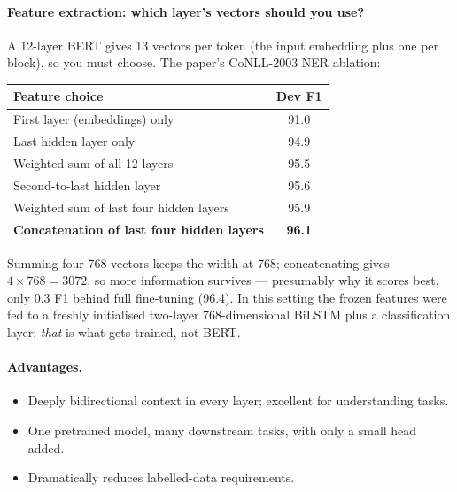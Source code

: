 \documentclass[11pt,a4paper]{article}
\begin{document}
\paragraph{Feature extraction: which layer's vectors should you use?} A 12-layer BERT gives 13
vectors per token (the input embedding plus one per block), so you must choose. The paper's
CoNLL-2003 NER ablation:
\begin{center}
\begin{tabular}{lc}
\textbf{Feature choice} & \textbf{Dev F1} \\
\hline
First layer (embeddings) only & 91.0 \\
Last hidden layer only & 94.9 \\
Weighted sum of all 12 layers & 95.5 \\
Second-to-last hidden layer & 95.6 \\
Weighted sum of last four hidden layers & 95.9 \\
\textbf{Concatenation of last four hidden layers} & \textbf{96.1} \\
\end{tabular}
\end{center}
Summing four 768-vectors keeps the width at 768; concatenating gives $4 \times 768 = 3072$, so
more information survives --- presumably why it scores best, only 0.3 F1 behind full
fine-tuning (96.4). In this setting the frozen features were fed to a freshly initialised
two-layer 768-dimensional BiLSTM plus a classification layer; \emph{that} is what gets trained,
not BERT.

\paragraph{Advantages.}
\begin{itemize}
\item Deeply bidirectional context in every layer; excellent for understanding tasks.
\item One pretrained model, many downstream tasks, with only a small head added.
\item Dramatically reduces labelled-data requirements.
\end{itemize}
\end{document}
